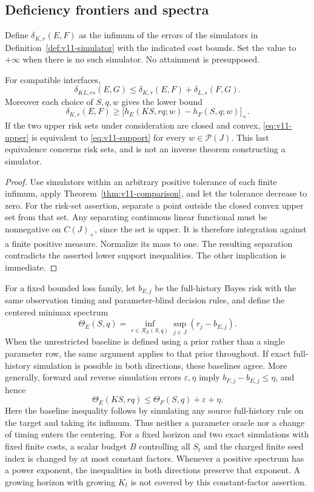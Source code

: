 \subsection{Deficiency frontiers and spectra}
Define $\delta_{K,r}(E,F)$ as the infimum of the errors of the simulators in
Definition~\ref{def:v11-simulator} with the indicated cost bounds. Set the
value to $+\infty$ when there is no such simulator. No attainment is
presupposed.

\begin{corollary}
\label{cor:v11-frontier}
For compatible interfaces,
\[
 \delta_{KL,rs}(E,G)
 \le \delta_{K,r}(E,F)+\delta_{L,s}(F,G).
\]
Moreover each choice of $S,q,w$ gives the lower bound
\[
 \delta_{K,r}(E,F)\ge
 \bigl[h_E(KS,rq;w)-h_F(S,q;w)\bigr]_+.
\]
If the two upper risk sets under consideration are closed and convex,
\eqref{eq:v11-upper} is equivalent to \eqref{eq:v11-support} for every
$w\in\mathcal P(J)$. This last equivalence concerns risk sets, and is not
an inverse theorem constructing a simulator.
\end{corollary}

\begin{proof}
Use simulators within an arbitrary positive tolerance of each finite
infimum, apply Theorem~\ref{thm:v11-comparison}, and let the tolerance
decrease to zero. For the risk-set assertion, separate a point outside
the closed convex upper set from that set. Any separating continuous
linear functional must be nonnegative on $C(J)_+$, since the set is upper.
It is therefore integration against a finite positive measure. Normalize
its mass to one. The resulting separation contradicts the asserted lower
support inequalities. The other implication is immediate.
\end{proof}

For a fixed bounded loss family, let $b_{E,j}$ be the full-history Bayes
risk with the same observation timing and parameter-blind decision rules,
and define the centered minimax spectrum
\[
 \Theta_E(S,q)=\inf_{r\in\mathcal R_E(S,q)}\sup_{j\in J}(r_j-b_{E,j}).
\]
When the unrestricted baseline is defined using a prior rather than a
single parameter row, the same argument applies to that prior throughout.
If exact full-history simulation is possible in both directions, these
baselines agree. More generally, forward and reverse simulation errors
$\varepsilon,\eta$ imply $b_{F,j}-b_{E,j}\le\eta$, and hence
\begin{equation}
 \Theta_E(KS,rq)\le\Theta_F(S,q)+\varepsilon+\eta.
 \label{eq:v11-centered}
\end{equation}
Here the baseline inequality follows by simulating any source
full-history rule on the target and taking its infimum. Thus neither a
parameter oracle nor a change of timing enters the centering.
For a fixed horizon and two exact simulations with fixed finite costs,
a scalar budget $B$ controlling all $S_t$ and the charged finite seed
index is changed by at most constant factors. Whenever a positive
spectrum has a power exponent, the inequalities in both directions
preserve that exponent. A growing horizon with growing $K_t$ is not covered
by this constant-factor assertion.

